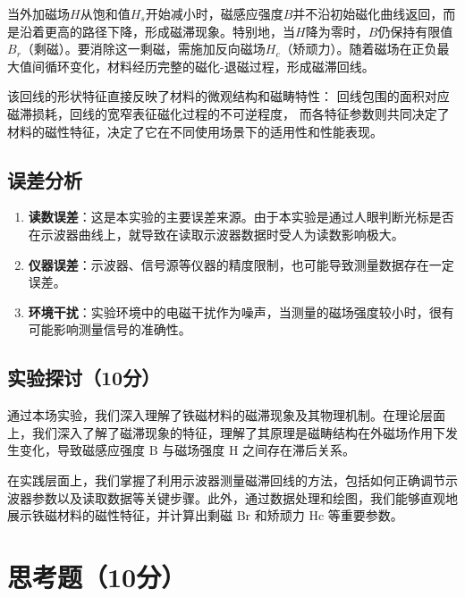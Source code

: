 \documentclass[]{../../templates/Report}%
\begin{document}
\begin{fullreportonly}
当外加磁场$H$从饱和值$H_s$开始减小时，磁感应强度$B$并不沿初始磁化曲线返回，而是沿着更高的路径下降，形成磁滞现象。特别地，当$H$降为零时，$B$仍保持有限值$B_r$（剩磁）。要消除这一剩磁，需施加反向磁场$H_c$（矫顽力）。随着磁场在正负最大值间循环变化，材料经历完整的磁化-退磁过程，形成磁滞回线。

该回线的形状特征直接反映了材料的微观结构和磁畴特性：
回线包围的面积对应磁滞损耗，回线的宽窄表征磁化过程的不可逆程度，
而各特征参数则共同决定了材料的磁性特征，决定了它在不同使用场景下的适用性和性能表现。
\subsection{误差分析}
\begin{enumerate}
    \item \textbf{读数误差}：这是本实验的主要误差来源。由于本实验是通过人眼判断光标是否在示波器曲线上，就导致在读取示波器数据时受人为读数影响极大。
    \item \textbf{仪器误差}：示波器、信号源等仪器的精度限制，也可能导致测量数据存在一定误差。
    \item \textbf{环境干扰}：实验环境中的电磁干扰作为噪声，当测量的磁场强度较小时，很有可能影响测量信号的准确性。
\end{enumerate}

\subsection{实验探讨（10分）}
通过本场实验，我们深入理解了铁磁材料的磁滞现象及其物理机制。在理论层面上，我们深入了解了磁滞现象的特征，理解了其原理是磁畴结构在外磁场作用下发生变化，导致磁感应强度 B 与磁场强度 H 之间存在滞后关系。

在实践层面上，我们掌握了利用示波器测量磁滞回线的方法，包括如何正确调节示波器参数以及读取数据等关键步骤。此外，通过数据处理和绘图，我们能够直观地展示铁磁材料的磁性特征，并计算出剩磁 Br 和矫顽力 Hc 等重要参数。


\section{思考题（10分）}

\end{fullreportonly}
\end{document}
